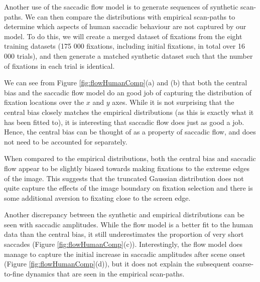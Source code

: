 Another use of the saccadic flow model is to generate sequences of synthetic scan-paths. We can then compare the distributions with empirical scan-paths to determine which aspects of human saccadic behaviour are not captured by our model. To do this, we will create a merged dataset of fixations from the eight training datasets (175 000 fixations, including initial fixations, in total over 16 000 trials), and then generate a matched synthetic dataset such that the number of fixations in each trial is identical. 

We can see from Figure \ref{fig:flowHumanComp}(a) and (b) that both the central bias and the saccadic flow model do an good job of capturing the distribution of fixation locations over the $x$ and $y$ axes. While it is not surprising that the central bias closely matches the empirical distributions (as this is exactly what it has been fitted to), it is interesting that saccadic flow does just as good a job. Hence, the central bias can be thought of as a property of saccadic flow, and does not need to be accounted for separately. 

When compared to the empirical distributions, both the central bias and saccadic flow appear to be slightly biased towards making fixations to the extreme edges of the image. This suggests that the truncated Gaussian distribution does not quite capture the effects of the image boundary on fixation selection and there is some additional aversion to fixating close to the screen edge. 

Another discrepancy between the synthetic and empirical distributions can be seen with saccadic amplitudes. While the flow model is a better fit to the human data than the central bias, it still underestimates the proportion of very short saccades (Figure \ref{fig:flowHumanComp}(c)). Interestingly, the flow model does manage to capture the initial increase in saccadic amplitudes after scene onset (Figure \ref{fig:flowHumanComp}(d)), but it does not explain the subsequent coarse-to-fine dynamics that are seen in the empirical scan-paths. 


